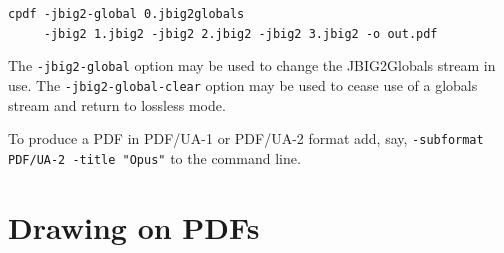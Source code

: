 \documentclass{book}
\begin{document}
\begin{framed}
 \noindent\small\verb?cpdf -jbig2-global 0.jbig2globals?\\
 \noindent\small\verb!     -jbig2 1.jbig2 -jbig2 2.jbig2 -jbig2 3.jbig2 -o out.pdf!
\end{framed}

\noindent The \texttt{-jbig2-global} option may be used to change the JBIG2Globals stream in use. The \texttt{-jbig2-global-clear} option may be used to cease use of a globals stream and return to lossless mode.

To produce a PDF in PDF/UA-1 or PDF/UA-2 format add, say, \texttt{-subformat PDF/UA-2 -title "Opus"} to the command line.

\clearpage\pagestyle{empty}
\chapter{Drawing on PDFs}\label{chap:18}\pagestyle{fancy}
\end{document}
